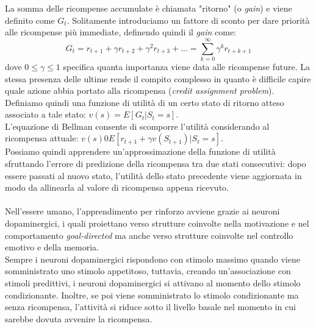 La somma delle ricompense accumulate è chiamata "ritorno" (o \textit{gain}) e viene definito come \(G_t\). Solitamente introduciamo un fattore di sconto per dare priorità alle ricompense più immediate, definendo quindi il \textit{gain} come:
\[G_t = r_{t+1} + \gamma r_{t+2} + \gamma^2 r_{t+3} + ... = \sum_{k=0}^\infty \gamma^k r_{t+k+1}\]
dove \(0 \leq \gamma \leq 1 \) specifica quanta importanza viene data alle ricompense future. La stessa presenza delle ultime rende il compito complesso in quanto è difficile capire quale azione abbia portato alla ricompensa (\textit{credit assignment problem}).\\
Definiamo quindi una funzione di utilità di un certo stato di ritorno atteso associato a tale stato: \(v(s) = E[G_t | S_t = s]\). \\
L'equazione di Bellman consente di scomporre l'utilità considerando al ricompensa attuale: \(v(s) 0 E[r_{t+1} + \gamma v(S_{t+1}) | S_t = s]\).\\
Possiamo quindi apprendere un'approssimazione della funzione di utilità sfruttando l'errore di predizione della ricompensa tra due stati consecutivi: dopo essere passati al nuovo stato, l'utilità dello stato precedente viene aggiornata in modo da allinearla al valore di ricompensa appena ricevuto.\\
\\
Nell'essere umano, l'apprendimento per rinforzo avviene grazie ai neuroni dopaminergici, i quali proiettano verso strutture coinvolte nella motivazione e nel comportamento \textit{goal-directed} ma anche verso strutture coinvolte nel controllo emotivo e della memoria.\\
Sempre i neuroni dopaminergici rispondono con stimolo massimo quando viene somministrato uno stimolo appetitoso, tuttavia, creando un'associazione con stimoli predittivi, i neuroni dopaminergici si attivano al momento dello stimolo condizionante. Inoltre, se poi viene somministrato lo stimolo condizionante ma senza ricompensa, l'attività si riduce sotto il livello basale nel momento in cui sarebbe dovuta avvenire la ricompensa.\\
